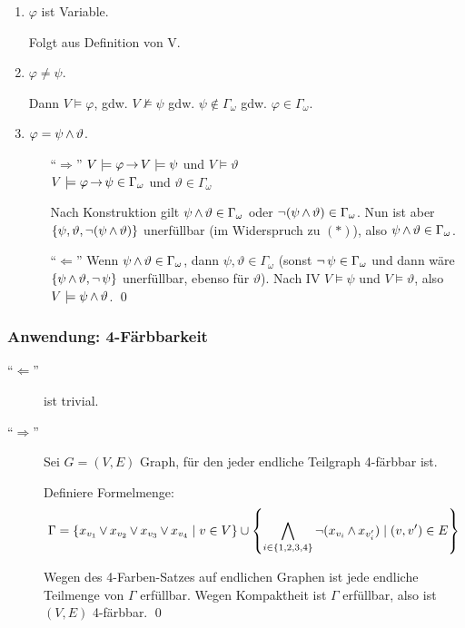\begin{enumerate}
  \item $\varphi$ ist Variable.\par
  Folgt aus Definition von V.
  
  \item $\varphi \not= \psi$.\par
  Dann $V\models\varphi$, gdw. $V\not\models\psi$ gdw. $\psi\not\in\Gamma_\omega$ gdw. $\varphi\in\Gamma_\omega$.
  
  \item $\varphi = \psi\operatorname{\wedge}\vartheta$.\par
  \begin{itemize}
    \item[\enquote{$\Rightarrow$}]
      $V\models\varphi \operatorname{\rightarrow} V\models\psi$ und $V\models\vartheta$\\
      $V\models\varphi \operatorname{\rightarrow} \psi\in\Gamma_\omega$ und $\vartheta\in\Gamma_\omega$
                                                    
    Nach Konstruktion gilt $\psi\operatorname{\wedge}\vartheta\in\Gamma_\omega$ oder
    $\operatorname{\neg}(\psi \operatorname{\wedge} \vartheta) \in \Gamma_\omega$. Nun ist aber
    $\left\{\psi, \vartheta, \operatorname{\neg}(\psi \operatorname{\wedge} \vartheta)\right\}$
    unerfüllbar (im Widerspruch zu $(*)$), also $\psi\operatorname{\wedge}\vartheta\in\Gamma_\omega$.
    
    \item[\enquote{$\Leftarrow$}]
    Wenn $\psi\operatorname{\wedge}\vartheta\in\Gamma_\omega$, dann $\psi,\vartheta\in\Gamma_\omega$
    (sonst $\operatorname{\neg}\psi\in\Gamma_\omega$ und dann wäre
    $\left\{\psi\operatorname{\wedge}\vartheta, \operatorname{\neg}\psi\right\}$ unerfüllbar, ebenso für $\vartheta$).
    Nach IV $V\models\psi$ und $V\models\vartheta$, also $V\models\psi\operatorname{\wedge}\vartheta$.
    \qed
  \end{itemize}
\end{enumerate}

\subsubsection{Anwendung: 4-Färbbarkeit}

\begin{description}
  \item[\enquote{$\Leftarrow$}] ist trivial.
  \item[\enquote{$\Rightarrow$}] Sei $G=(V,E)$ Graph, für den jeder endliche
  Teilgraph 4-färbbar ist.

  Definiere Formelmenge:
  \[
    \Gamma = \left\{x_{v_1} \operatorname{\vee} x_{v_2} \operatorname{\vee} x_{v_3} \operatorname{\vee} x_{v_4} \mid v \in V\right\}
      \cup \left\{\operatorname*{\bigwedge}_{i\in\left\{1,2,3,4\right\}} \operatorname{\neg} (x_{v_i} \operatorname{\wedge} x_{v_i'}) \mid (v,v')\in E \right\}
  \]

  Wegen des 4-Farben-Satzes auf endlichen Graphen ist jede endliche Teilmenge
  von $\Gamma$ erfüllbar. Wegen Kompaktheit ist $\Gamma$ erfüllbar, also ist
  $(V,E)$ 4-färbbar.
  \qed
\end{description}

